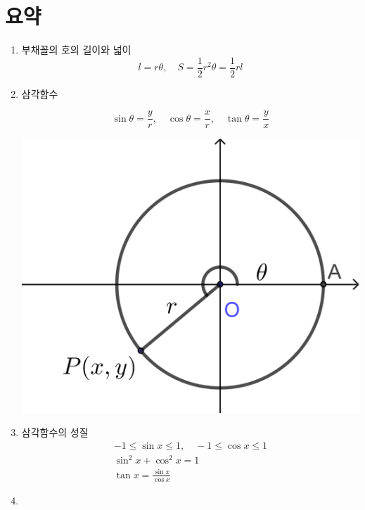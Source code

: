 \documentclass{oblivoir}
\begin{document}
\section*{요약}
\begin{enumerate}[label=\arabic*]
\item
부채꼴의 호의 길이와 넓이
\[l=r\theta,\quad S=\frac12r^2\theta=\frac12rl\]
\item
삼각함수\\
\noindent\begin{minipage}{.6\textwidth}
\[\sin\theta=\frac yr,\quad\cos\theta=\frac xr,\quad\tan\theta=\frac yx\]
\end{minipage}
\begin{minipage}{.4\textwidth}
\centering
\includegraphics[width=.8\textwidth]{summary_4}
\end{minipage}
\item
삼각함수의 성질
\begin{gather*}
-1\le\sin x\le1,\quad-1\le\cos x\le1\\
\sin^2x+\cos^2x=1\\
\tan x=\frac{\sin x}{\cos x}%
\end{gather*}
\item

\end{enumerate}
\end{document}
